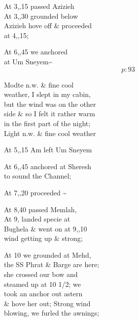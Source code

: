 \documentclass{report}
\begin{document}
	\par{
 	At 3,,15 passed Azizieh\ \\At 3,,30 grounded below\ \\Azizieh hove off \& proceeded\ \\at 4,,15;\ \\
	}

	\par{
 	At 6,,45 we anchored\ \\at Um Sneyem\~{}\ \\
  \[p: 93 \]

	}


	\par{
 	Modte n.w. \& fine cool\ \\weather, I slept in my cabin,\ \\but the wind was on the other\ \\side \& so I felt it rather warm\ \\in the first part of the night;\ \\Light n.w. \& fine cool weather\ \\
	}

	\par{
 	At 5,,15 Am left Um Sneyem\ \\
	}

	\par{
 	At 6,,45 anchored at Sheresh\ \\to sound the Channel;\ \\
	}

	\par{
 	At 7,,20 proceeded \~{}\ \\
	}

	\par{
 	At 8,40 passed Memlah,\ \\At 9, landed specie at\ \\Bughela \& went on at 9,,10\ \\wind getting up \& strong;\ \\
	}

	\par{
 	At 10 we grounded at Mehd,\ \\the SS Phrat \& Barge are here;\ \\she crossed our bow and\ \\steamed up at 10 1/2; we\ \\took an anchor out astern\ \\\& hove her out; Strong wind\ \\blowing, we furled the awnings;\ \\
	}
\end{document}
